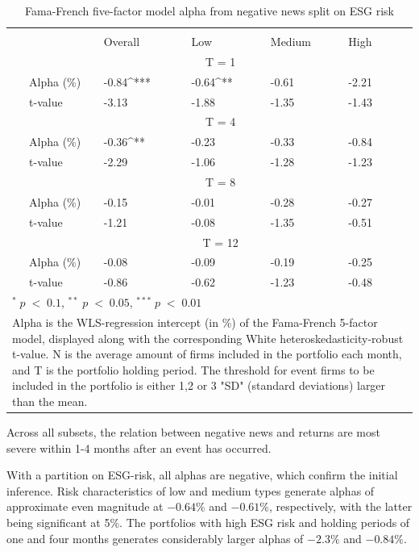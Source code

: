 \setlength{\tabcolsep}{15pt}
\begin{table}[H]
\small
\centering
\caption{Fama-French five-factor model alpha from negative news split on ESG risk} 
\begin{tabular}{llllllc}
\hline \hline \\ 
 &     & Overall &    Low  &  Medium  &  High &  \\    \cline{3-6} 
& &  \multicolumn{3}{c}{ T = 1} & \\ \cline{2-6}
& Alpha (\%)    & -0.84^{***} & -0.64^{**}  & -0.61  & -2.21 &  \\ 
& t-value   & -3.13 & -1.88 & -1.35  & -1.43 &  \\
& &  \multicolumn{3}{c}{ T = 4} & \\ \cline{2-6}
& Alpha (\%)   & -0.36^{**} & -0.23  & -0.33  &  -0.84 & \\
& t-value &   -2.29 & -1.06 & -1.28  & -1.23 & \\
& &  \multicolumn{3}{c}{ T = 8} & \\ \cline{2-6}
& Alpha (\%)    & -0.15 & -0.01   & -0.28  & -0.27 &  \\
& t-value &   -1.21 & -0.08  & -1.35 & -0.51 &  \\
& &  \multicolumn{3}{c}{ T = 12} & \\ \cline{2-6}
& Alpha (\%)    & -0.08 & -0.09  & -0.19  & -0.25 &  \\
& t-value &    -0.86 & -0.62  & -1.23 & -0.48 &  \\
\hline \hline
 \multicolumn{7}{l}{ \footnotesize $^* \; p\; <\; 0.1$, $ ^{**} \; p\; <\; 0.05$, $ ^{***} \; p\; <\; 0.01$  } \\
 \multicolumn{7}{p{12cm}}{ \footnotesize Alpha is the WLS-regression intercept (in \%) of the Fama-French 5-factor model, displayed along with the corresponding White heteroskedasticity-robust t-value. N is the average amount of firms included in the portfolio each month, and T is the portfolio holding period. The threshold for event firms to be included in the portfolio is either 1,2 or 3 "SD" (standard deviations) larger than the mean.} \\ 
 \hline
\end{tabular}
\label{tab: FF5_neg_ESG}
\end{table}

Across all subsets, the relation between negative news and returns are most severe within 1-4 months after an event has occurred. 

With a partition on ESG-risk, all alphas are negative, which confirm the initial inference. Risk characteristics of low and medium types generate alphas of approximate even magnitude at $-0.64\%$ and $-0.61\%$, respectively, with the latter being significant at 5\%. The portfolios with high ESG risk and holding periods of one and four months generates considerably larger alphas of $-2.3\%$ and $-0.84\%$.  


